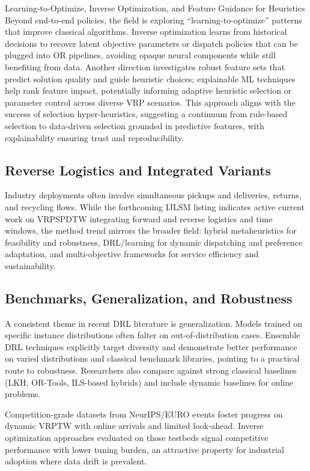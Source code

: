 Learning-to-Optimize, Inverse Optimization, and Feature Guidance for Heuristics
Beyond end-to-end policies, the field is exploring “learning-to-optimize” patterns that improve classical algorithms. Inverse optimization learns from historical decisions to recover latent objective parameters or dispatch policies that can be plugged into OR pipelines, avoiding opaque neural components while still benefiting from data. Another direction investigates robust feature sets that predict solution quality and guide heuristic choices; explainable ML techniques help rank feature impact, potentially informing adaptive heuristic selection or parameter control across diverse VRP scenarios. This approach aligns with the success of selection hyper-heuristics, suggesting a continuum from rule-based selection to data-driven selection grounded in predictive features, with explainability ensuring trust and reproducibility.​

\subsection{Reverse Logistics and Integrated Variants}
Industry deployments often involve simultaneous pickups and deliveries, returns, and recycling flows. While the forthcoming IJLSM listing indicates active current work on VRPSPDTW integrating forward and reverse logistics and time windows, the method trend mirrors the broader field: hybrid metaheuristics for feasibility and robustness, DRL/learning for dynamic dispatching and preference adaptation, and multi-objective frameworks for service efficiency and sustainability.​

\subsection{Benchmarks, Generalization, and Robustness}
A consistent theme in recent DRL literature is generalization. Models trained on specific instance distributions often falter on out-of-distribution cases. Ensemble DRL techniques explicitly target diversity and demonstrate better performance on varied distributions and classical benchmark libraries, pointing to a practical route to robustness. Researchers also compare against strong classical baselines (LKH, OR-Tools, ILS-based hybrids) and include dynamic baselines for online problems.​

Competition-grade datasets from NeurIPS/EURO events foster progress on dynamic VRPTW with online arrivals and limited look-ahead. Inverse optimization approaches evaluated on those testbeds signal competitive performance with lower tuning burden, an attractive property for industrial adoption where data drift is prevalent.​

